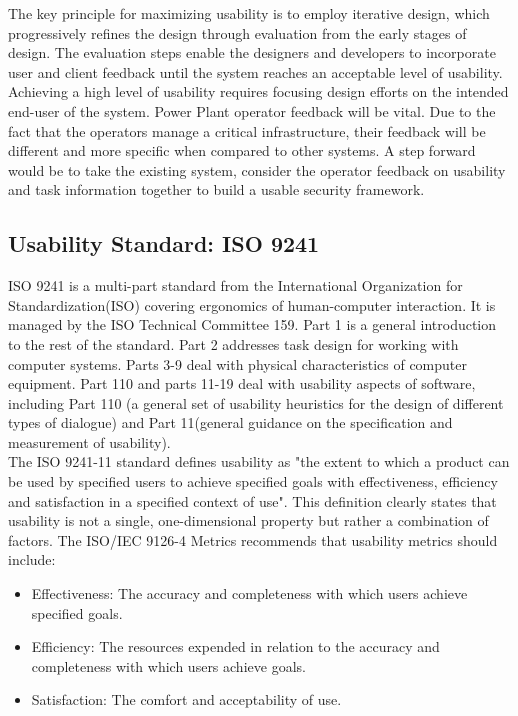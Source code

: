 \smallskip

The key principle for maximizing usability is to employ iterative design, which progressively refines the design through evaluation from the early stages of design. The evaluation steps enable the designers and developers to incorporate user and client feedback until the system reaches an acceptable level of usability. Achieving a high level of usability requires focusing design efforts on the intended end-user of the system. Power Plant operator feedback will be vital. Due to the fact that the operators manage a critical infrastructure, their feedback will be different and more specific when compared to other systems. A step forward would be to take the existing system, consider the operator feedback on usability and task information together to build a usable security framework.

\subsection{Usability Standard: ISO 9241}

ISO 9241 is a multi-part standard from the International Organization for Standardization(ISO) covering ergonomics of human-computer interaction. It is managed by the ISO Technical Committee 159. Part 1 is a general introduction to the rest of the standard. Part 2 addresses task design for working with computer systems. Parts 3-9 deal with physical characteristics of computer equipment. Part 110 and parts 11-19 deal with usability aspects of software, including Part 110 (a general set of usability heuristics for the design of different types of dialogue) and Part 11(general guidance on the specification and measurement of usability). \\

The ISO 9241-11 standard defines usability as "the extent to which a product can be used
by specified users to achieve specified goals with effectiveness, efficiency and satisfaction
in a specified context of use". This definition clearly states that usability is not a single,
one-dimensional property but rather a combination of factors.
The ISO/IEC 9126-4 Metrics recommends that usability metrics should include:
\begin{itemize}
\item Effectiveness: The accuracy and completeness with which users achieve specified
goals.

\item Efficiency: The resources expended in relation to the accuracy and completeness
with which users achieve goals.

\item Satisfaction: The comfort and acceptability of use.
\end{itemize}

